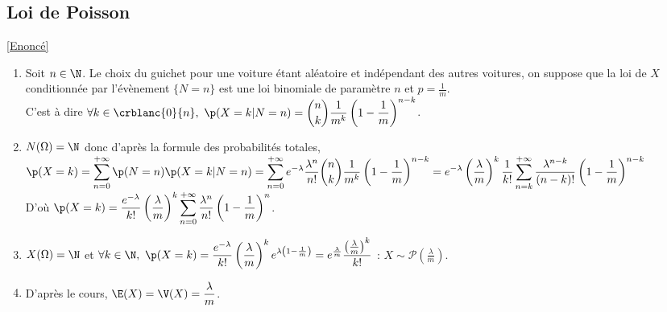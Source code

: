 \documentclass[8pt]{book}
\begin{document}
	\subsection{Loi de Poisson }
	\label{Loi de Poisson corrigé}
		\textcolor{blue}{\hyperref[Loi de Poisson]{[Enoncé]}}\\
	\begin{enumerate}
		\item Soit $n\in \N$. Le choix du guichet pour une voiture étant aléatoire et indépendant des autres voitures, on suppose que la loi de $X$ conditionnée par l'évènement $\{N=n\}$ est une loi binomiale de paramètre $n$ et $p=\displaystyle\frac{1}{m}$.\\
		C'est à dire $\forall k\in \crblanc{0}{n},\ \p(X=k|N=n)=\displaystyle\binom{n}{k}\frac{1}{m^k}\left(1-\frac{1}{m}\right)^{n-k}$.
		\item $N(\Omega)=\N$ donc d'après la formule des probabilités totales,\\
		$\p(X=k)=\displaystyle\sum\limits_{n=0}^{+\infty}\p(N=n)\p(X=k|N=n)=\sum\limits_{n=0}^{+\infty}e^{-\lambda}\frac{\lambda^n}{n!}\binom{n}{k}\frac{1}{m^k}\left(1-\frac{1}{m}\right)^{n-k}=e^{-\lambda}\left(\frac{\lambda}{m}\right)^k\frac{1}{k!}\sum\limits_{n=k}^{+\infty}\frac{\lambda^{n-k}}{(n-k)!}\left(1-\frac{1}{m}\right)^{n-k}$\\
		D'où $\p(X=k)=\displaystyle\frac{e^{-\lambda}}{k!}\left(\frac{\lambda}{m}\right)^k\sum\limits_{n=0}^{+\infty}\frac{\lambda^n}{n!}\left(1-\frac{1}{m}\right)^n$.
		\item $X(\Omega)=\N$ et $\forall k\in \N,\ \p(X=k)=\displaystyle\frac{e^{-\lambda}}{k!}\left(\frac{\lambda}{m}\right)^ke^{\lambda\left(1-\frac{1}{m}\right)}=e^{\frac{\lambda}{m}}\displaystyle\frac{\left(\frac{\lambda}{m}\right)^k}{k!}$ : $X\sim\mathcal{P}\left(\displaystyle\frac{\lambda}{m}\right)$.
		\item D'après le cours, $\E(X)=\V(X)=\displaystyle\frac{\lambda}{m}$.
	\end{enumerate}
	
\end{document}
